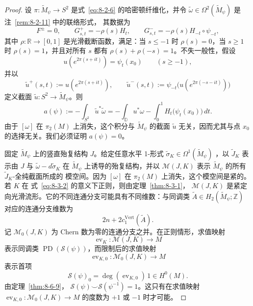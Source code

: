 \begin{proof}
设 $\pi:\widetilde M_\psi\to S^2$ 是式~\eqref{eq:8-2-6} 的哈密顿纤维化，并令
$\widetilde\omega\in\Omega^2(\widetilde M_\psi)$ 是注~\ref{rem:8-2-11} 中的联络形式，
其数据为
\[
  F^\pm=0,\qquad
  G^+_{s,t}=-\rho(s)H_t,\qquad
  G^-_{s,t}=-\rho(s)H_{-t}\circ\psi_{-t},
\]
其中 $\rho:\mathbb R\to[0,1]$ 是光滑截断函数，满足：当 $s\le-1$ 时
$\rho(s)=0$，当 $s\ge1$ 时 $\rho(s)=1$，并且对所有 $s$ 都有
$\rho(s)+\rho(-s)=1$。不失一般性，假设
\[
  u(e^{2\pi(s+it)})=\psi_t(x_0)\qquad(s\ge-1),
\]
并以
\[
  \widetilde u^+(s,t):=u(e^{2\pi(s+it)}),\qquad
  \widetilde u^-(s,t):=
  \psi_{-t}\bigl(u(e^{2\pi(-s-it)})\bigr)
\]
定义截面 $\widetilde u:S^2\to\widetilde M_\psi$。则
\[
  a(\psi):=-\int_{S^2}\widetilde u^*\widetilde\omega
  =-\int_{\mathbb D}u^*\omega
   -\int_0^1H_t\bigl(\psi_t(x_0)\bigr)\,dt.
\]
由于 $[\omega]$ 在 $\pi_2(M)$ 上消失，这个积分与 $\widetilde M_\psi$ 的截面
$\widetilde u$ 无关，因而尤其与点 $x_0$ 的选择无关。我们必须证明 $a(\psi)=0$。

固定 $\widetilde M_\psi$ 上的竖直殆复结构 $J$。给定任意水平 1-形式
$\widetilde\sigma_K\in\Omega^1(\widetilde M_\psi)$
，以 $\widetilde J_K$ 表示由 $J$ 与
$\widetilde\omega-d\widetilde\sigma_K$ 在 $\widetilde M_\psi$ 上诱导的殆复结构，并以
$\mathcal M(J,K)$ 表示 $\widetilde M_\psi$ 的所有 $\widetilde J_K$-全纯截面所成的
模空间。因为 $[\omega]$ 在 $\pi_2(M)$ 上消失，这个模空间是紧的。若 $K$ 在
式~\eqref{eq:8-3-2} 的意义下正则，则由定理~\ref{thm:8-3-1}，
$\mathcal M(J,K)$ 是紧定向光滑流形。它的不同连通分支可能具有不同维数：与同调类
$\widetilde A\in H_2(\widetilde M_\psi;\mathbb Z)$ 对应的连通分支维数为
\[
  2n+2c_1^{\mathrm{Vert}}(\widetilde A).
\]
记 $\mathcal M_0(J,K)$ 为 Chern 数为零的连通分支之并。在正则情形，求值映射
\[
  \operatorname{ev}_K:\mathcal M(J,K)\longrightarrow M
\]
表示同调类 $\operatorname{PD}(\mathcal S(\psi))$，而限制后的求值映射
\[
  \operatorname{ev}_{K,0}:\mathcal M_0(J,K)\longrightarrow M
\]
表示首项
\[
  \mathcal S(\psi)_0
  =\deg(\operatorname{ev}_{K,0})\,1\in H^0(M).
\]
由定理~\ref{thm:8-6-9}，
$\mathcal S(\psi)\smile\mathcal S(\psi^{-1})=1$。这只有在求值映射
$\operatorname{ev}_{K,0}:\mathcal M_0(J,K)\to M$ 的度数为 $+1$ 或 $-1$ 时才可能。


\end{proof}
